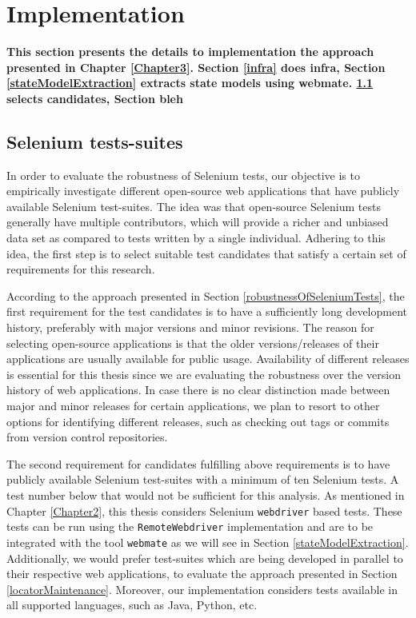 \chapter{Implementation}
\label{Chapter4}

\textbf{This section presents the details to implementation the approach presented in Chapter \ref{Chapter3}. Section \ref{infra} does infra, Section \ref{stateModelExtraction} extracts state models using webmate. \ref{selectingCandidates} selects candidates, Section bleh}

\section{Selenium tests-suites}
\label{selectingCandidates}
In order to evaluate the robustness of Selenium tests, our objective is to empirically investigate different open-source web applications that have publicly available Selenium test-suites. The idea was that open-source Selenium tests generally have multiple contributors, which will provide a richer and unbiased data set as compared to tests written by a single individual. Adhering to this idea, the first step is to select suitable test candidates that satisfy a certain set of requirements for this research. 

According to the approach presented in Section \ref{robustnessOfSeleniumTests}, the first requirement for the test candidates is to have a sufficiently long development history, preferably with major versions and minor revisions. The reason for selecting open-source applications is that the older versions/releases of their applications are usually available for public usage. Availability of different releases is essential for this thesis since we are evaluating the robustness over the version history of web applications. In case there is no clear distinction made between major and minor releases for certain applications, we plan to resort to other options for identifying different releases, such as checking out tags or commits from version control repositories. 

The second requirement for candidates fulfilling above requirements is to have publicly available Selenium test-suites with a minimum of ten Selenium tests. A test number below that would not be sufficient for this analysis. As mentioned in Chapter \ref{Chapter2}, this thesis considers Selenium \texttt{webdriver} based tests. These tests can be run using the \texttt{RemoteWebdriver} implementation and are to be integrated with the tool \texttt{webmate} as we will see in Section \ref{stateModelExtraction}. Additionally, we would prefer test-suites which are being developed in parallel to their respective web applications, to evaluate the approach presented in Section \ref{locatorMaintenance}. Moreover, our implementation  considers tests available in all supported languages, such as Java, Python, etc. 



